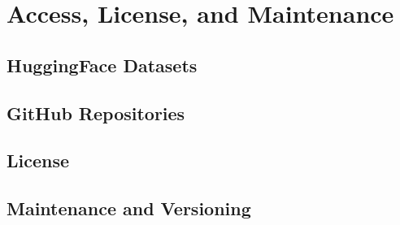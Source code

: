 \section{Access, License, and Maintenance}

\subsection{HuggingFace Datasets}

\subsection{GitHub Repositories}

\subsection{License}

\subsection{Maintenance and Versioning}
